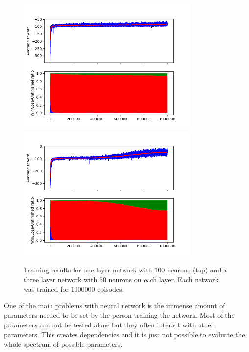 \begin{figure}
	\centering
	\includegraphics[width=0.8\textwidth]{images/one_layer.png}
	\includegraphics[width=0.8\textwidth]{images/three_layers.png}
	\caption{Training results for one layer network with $100$ neurons (top) and a three layer network with $50$ neurons on each layer. Each network was trained for $1000000$ episodes.}
	\label{fig:layer_test}
\end{figure}

One of the main problems with neural network is the immense amount of parameters needed to be set by the person training the network.
Most of the parameters can not be tested alone but they often interact with other parameters.
This creates dependencies and it is just not possible to evaluate the whole spectrum of possible parameters.
